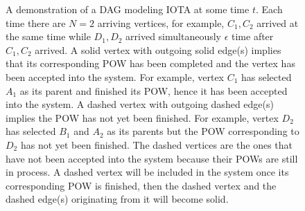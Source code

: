 \documentclass[12pt]{article}
\numberwithin{equation}{section}  %
\begin{document}
\begin{figure}
\centering
{}
\caption{A demonstration of a DAG modeling IOTA at some time $t$. Each time there are $N=2$ arriving vertices, for example, $C_1,C_2$ arrived at the same time while $D_1,D_2$ arrived simultaneously $\epsilon$ time after $C_1,C_2$ arrived. A solid vertex with outgoing solid edge(s) implies that its corresponding POW has been completed and the vertex has been accepted into the system. For example, vertex $C_1$ has selected $A_1$ as its parent and finished its POW, hence it has been accepted into the system. A dashed vertex with outgoing dashed edge(s) implies the POW has not yet been finished. For example, vertex $D_2$ has selected $B_1$ and $A_2$ as its parents but the POW corresponding to $D_2$ has not yet been finished. The dashed vertices are the ones that have not been accepted into the system because their POWs are still in process. A dashed vertex will be included in the system once its corresponding POW is finished, then the dashed vertex and the dashed edge(s) originating from it will become solid.}
\label{kchoice_demon_graph2}
\end{figure}
\end{document}
